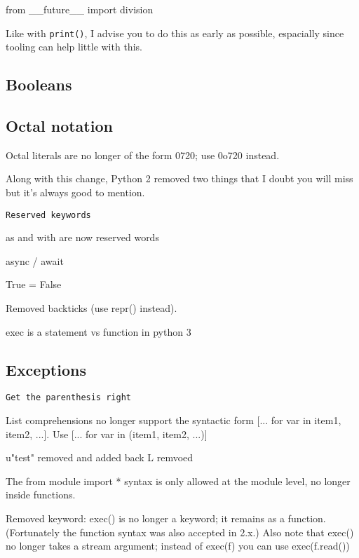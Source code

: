 \begin{py2and3}
from __future__ import division
\end{py2and3}

Like with \lstinline{print()}, I advise you to do this as early as possible, espacially since tooling can help little with this.

\subsection{Booleans}

\subsection{Octal notation}

Octal literals are no longer of the form 0720; use 0o720 instead.


Along with this change, Python 2 removed two things that I doubt you will miss but it's always good to mention.

\lstinline{Reserved keywords}

as and with are now reserved words

async / await

True = False

Removed backticks (use repr() instead).

exec is a statement vs function in python 3



\subsection{Exceptions}


\lstinline{Get the parenthesis right}

List comprehensions no longer support the syntactic form [... for var in item1, item2, ...]. Use [... for var in (item1, item2, ...)]



u"test" removed and added back
L remvoed

The from module import * syntax is only allowed at the module level, no longer inside functions.

Removed keyword: exec() is no longer a keyword; it remains as a function. (Fortunately the function syntax was also accepted in 2.x.) Also note that exec() no longer takes a stream argument; instead of exec(f) you can use exec(f.read())

